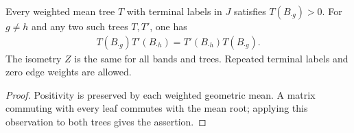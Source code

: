 \begin{theorem}
\label{thm:replica_symmetric_band_mean_roots}
\leanok
Every weighted mean tree $T$ with terminal labels in $J$ satisfies
$T(B_{\cdot g})>0$. For $g\ne h$ and any two such trees $T,T'$, one has
\begin{align*}
 T(B_{\cdot g})T'(B_{\cdot h})
 =T'(B_{\cdot h})T(B_{\cdot g}).
\end{align*}
The isometry $Z$ is the same for all bands and trees. Repeated terminal
labels and zero edge weights are allowed.
\end{theorem}
\begin{proof}
\leanok
{}
Positivity is preserved by each weighted geometric mean. A matrix
commuting with every leaf commutes with the mean root; applying this
observation to both trees gives the assertion.
\end{proof}
